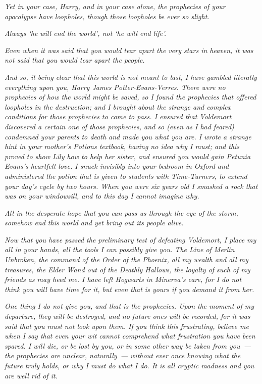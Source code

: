 \emph{Yet in your case, Harry, and in your case alone, the prophecies of your apocalypse have loopholes, though those loopholes be ever so slight.}

\emph{Always `he will end the world', not `he will end life'.}

\emph{Even when it was said that you would tear apart the very stars in heaven, it was not said that you would tear apart the people.}

\emph{And so, it being clear that this world is not meant to last, I have gambled literally everything upon you, Harry James Potter-Evans-Verres. There were no prophecies of how the world might be saved, so I found the prophecies that offered loopholes in the destruction; and I brought about the strange and complex conditions for those prophecies to come to pass. I ensured that Voldemort discovered a certain one of those prophecies, and so (even as I had feared) condemned your parents to death and made you what you are. I wrote a strange hint in your mother's Potions textbook, having no idea why I must; and this proved to show Lily how to help her sister, and ensured you would gain Petunia Evans's heartfelt love. I snuck invisibly into your bedroom in Oxford and administered the potion that is given to students with Time-Turners, to extend your day's cycle by two hours. When you were six years old I smashed a rock that was on your windowsill, and to this day I cannot imagine why.}

\emph{All in the desperate hope that you can pass us through the eye of the storm, somehow end this world and yet bring out its people alive.}

\emph{Now that you have passed the preliminary test of defeating Voldemort, I place my all in your hands, all the tools I can possibly give you. The Line of Merlin Unbroken, the command of the Order of the Phoenix, all my wealth and all my treasures, the Elder Wand out of the Deathly Hallows, the loyalty of such of my friends as may heed me. I have left Hogwarts in Minerva's care, for I do not think you will have time for it, but even that is yours if you demand it from her.}

\emph{One thing I do not give you, and that is the prophecies. Upon the moment of my departure, they will be destroyed, and no future ones will be recorded, for it was said that you must not look upon them. If you think this frustrating, believe me when I say that even your wit cannot comprehend what frustration you have been spared. I will die, or be lost by you, or in some other way be taken from you~--- the prophecies are unclear, naturally~--- without ever once knowing what the future truly holds, or why I must do what I do. It is all cryptic madness and you are well rid of it.}

